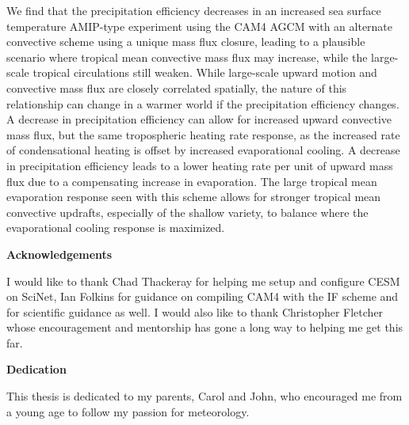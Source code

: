 We find that the precipitation efficiency decreases in an increased sea surface temperature AMIP-type experiment using the CAM4 AGCM with an alternate convective scheme using a unique mass flux closure, leading to a plausible scenario where tropical mean convective mass flux may increase, while the large-scale tropical circulations still weaken. While large-scale upward motion and convective mass flux are closely correlated spatially, the nature of this relationship can change in a warmer world if the precipitation efficiency changes. A decrease in precipitation efficiency can allow for increased upward convective mass flux, but the same tropospheric heating rate response, as the increased rate of condensational heating is offset by increased evaporational cooling. A decrease in precipitation efficiency leads to a lower heating rate per unit of upward mass flux due to a compensating increase in evaporation. The large tropical mean evaporation response seen with this scheme allows for stronger tropical mean convective updrafts, especially of the shallow variety, to balance where the evaporational cooling response is maximized. 
\cleardoublepage


\begin{center}\textbf{Acknowledgements}\end{center}

I would like to thank Chad Thackeray for helping me setup and configure CESM on SciNet, Ian Folkins for guidance on compiling CAM4 with the IF scheme and for scientific guidance as well. I would also like to thank Christopher Fletcher whose encouragement and mentorship has gone a long way to helping me get this far.
\cleardoublepage


\begin{center}\textbf{Dedication}\end{center}
This thesis is dedicated to my parents, Carol and John, who encouraged me from a young age to follow my passion for meteorology.
\cleardoublepage

\renewcommand\contentsname{Table of Contents}
\tableofcontents
\cleardoublepage
{}    %

\listoftables
\cleardoublepage
{}		%

\listoffigures
\cleardoublepage
{}		%

\cleardoublepage
{}		%


